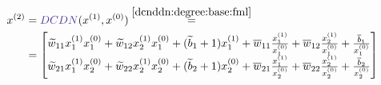 \documentclass{report}
\begin{document}
\begin{align}
    x^{(2)} &= \color{Violet}DCDN\color{black}(x^{(1)}, x^{(0)}) \overset{\ref{dcnddn:degree:base:fml}}{=}\nonumber \\
    &=\begin{bmatrix}
        \widetilde{w}_{11}x_1^{(1)}x_1^{(0)} + \widetilde{w}_{12}x_2^{(1)}x_1^{(0)} + (\widetilde{b}_1 + 1)x_1^{(1)} + \overline{w}_{11}\frac{x_1^{(1)}}{x_1^{(0)}}+\overline{w}_{12}\frac{x_2^{(1)}}{x_1^{(0)}} + \frac{\overline{b}_1}{x_1^{(0)}}\\
        \widetilde{w}_{21}x_1^{(1)}x_2^{(0)} + \widetilde{w}_{22}x_2^{(1)}x_2^{(0)} + (\widetilde{b}_2 + 1)x_2^{(0)} + \overline{w}_{21}\frac{x_1^{(1)}}{x_2^{(0)}}+\overline{w}_{22}\frac{x_2^{(1)}}{x_2^{(0)}} + \frac{\overline{b}_2}{x_2^{(0)}}
    \end{bmatrix} \label{dcnddn:2ndlayer:2ndlayer}
\end{align}
\end{document}
